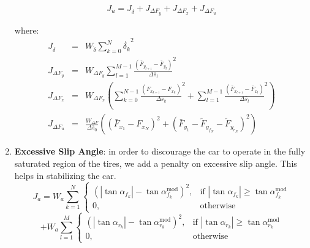 \documentclass[a4paper, onecolumn, 12pt]{article}
\begin{document}
\begin{enumerate}
    \begin{equation}
        J_{\dot{u}} = J_{\dot{\delta}} + J_{\Delta F_y} + J_{\Delta F_x} + J_{\Delta F_u}
    \end{equation}

    where:
    \begin{eqnarray}
        J_{\dot{\delta}} &=& W_{\dot{\delta}}\sum_{k=0}^{N} \dot{\delta_k}^2 \\
        J_{\Delta F_y} &=& W_{\Delta F_y} \sum_{l=1}^{M-1} \frac{\left(\bar{F}_{y_{l+1}}-\bar{F}_{y_{l}}\right)}{\Delta \bar{s}_l}^2 \\
        J_{\Delta F_x} &=& W_{\Delta F_x} \left(\sum_{k=0}^{N-1} \frac{\left({F}_{x_{k+1}}-{F}_{x_{k}}\right)}{\Delta {s}_k}^2  + 
                                                \sum_{l=1}^{M-1} \frac{\left(\bar{F}_{x_{l+1}}-\bar{F}_{x_{l}}\right)}{\Delta \bar{s}_l}^2  \right) \\
        J_{\Delta F_u} &=& \frac{W_{\Delta F}}{\Delta \bar{s}_0}\left( \left(\bar{F}_{x_1}-F_{x_N}\right)^2 + \left(\bar{F}_{y_1}-\tilde{F}_{y_{f_N}}-\tilde{F}_{y_{r_N}}\right)^2 \right) 
    \end{eqnarray}

    \item \textbf{Excessive Slip Angle}: in order to discourage the car to operate in the fully saturated region of the tires, we add a penalty on excessive slip angle. This helps in stabilizing the car.
    \begin{equation}
        J_{a} = W_{a}\sum_{k=1}^{N}
        \begin{cases}
        \left(|\tan \alpha_{f_k}|-\tan \alpha_{f_k}^{\text{mod}}\right)^2, & \text{if } |\tan \alpha_{f_k}| \geq  \tan \alpha_{f_k}^{\text{mod}}\\
        0, & \text{otherwise}
        \end{cases}
        \end{equation}
        \[  + W_{a}\sum_{l=1}^{M} 
        \begin{cases}
        \left(|\tan \alpha_{r_k}|-\tan \alpha_{r_k}^{\text{mod}}\right)^2, & \text{if } |\tan \alpha_{r_k}| \geq  \tan \alpha_{r_k}^{\text{mod}}\\
        0, & \text{otherwise}
        \end{cases}
        \]
\end{enumerate}
\end{document}
